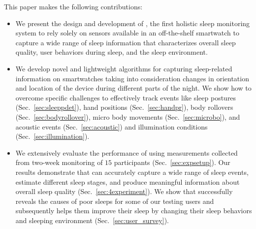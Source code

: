 This paper makes the following contributions:

\begin{itemize}
	\item We present the design and development of {\systemname}, the first holistic sleep monitoring system to rely solely on sensors
available in an off-the-shelf smartwatch to capture a wide range of sleep information that characterizes overall sleep quality, user
behaviors during sleep, and the sleep environment.
	
\item We develop novel and lightweight algorithms for capturing sleep-related information on smartwatches taking into consideration changes
in orientation and location of the device during different parts of the night. We show how to overcome specific challenges to effectively
track events like sleep postures (Sec.~\ref{sec:sleeppdet}), hand positions (Sec.~\ref{sec:handpr}), body rollovers
(Sec.~\ref{sec:bodyrollover}), micro body movements (Sec.~\ref{sec:microbo}), and acoustic events (Sec.~\ref{sec:acoustic}) and
illumination conditions (Sec.~\ref{sec:illumination}).
	

    \item We extensively evaluate the performance of {\systemname} using measurements collected from two-week monitoring of $15$
    participants (Sec.~\ref{sec:expsetup}). Our results demonstrate that {\systemname} can accurately capture a wide range of sleep events,
    estimate different sleep stages, and produce meaningful information about overall sleep quality (Sec.~\ref{sec:4experiment}). We show that {\systemname} successfully reveals the causes of poor sleeps for some of our testing users and subsequently helps them improve their sleep by changing their sleep behaviors and sleeping environment  (Sec.~\ref{sec:user_survey}).
\end{itemize}
